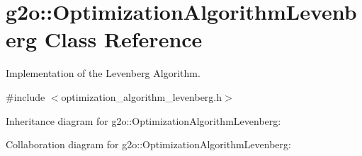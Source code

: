 \hypertarget{classg2o_1_1OptimizationAlgorithmLevenberg}{}\section{g2o\+:\+:Optimization\+Algorithm\+Levenberg Class Reference}
\label{classg2o_1_1OptimizationAlgorithmLevenberg}


Implementation of the Levenberg Algorithm.  




{\ttfamily \#include $<$optimization\+\_\+algorithm\+\_\+levenberg.\+h$>$}



Inheritance diagram for g2o\+:\+:Optimization\+Algorithm\+Levenberg\+:


Collaboration diagram for g2o\+:\+:Optimization\+Algorithm\+Levenberg\+:
